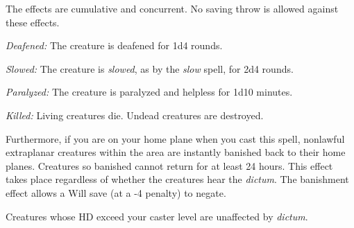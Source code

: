 The effects are cumulative and concurrent. No saving throw is allowed against these 
effects.

\textit{Deafened:} The creature is deafened for 1d4 rounds.

\textit{Slowed:} The creature is \textit{slowed}, as by the \textit{slow} spell, 
for 2d4 rounds.

\textit{Paralyzed:} The creature is paralyzed and helpless for 1d10 minutes.

\textit{Killed:} Living creatures die. Undead creatures are destroyed.

Furthermore, if you are on your home plane when you cast this spell, nonlawful 
extraplanar creatures within the area are instantly banished back to their home 
planes. Creatures so banished cannot return for at least 24 hours. This effect 
takes place regardless of whether the creatures hear the \textit{dictum}. The banishment 
effect allows a Will save (at a -4 penalty) to negate.

Creatures whose HD exceed your caster level are unaffected by \textit{dictum}.

